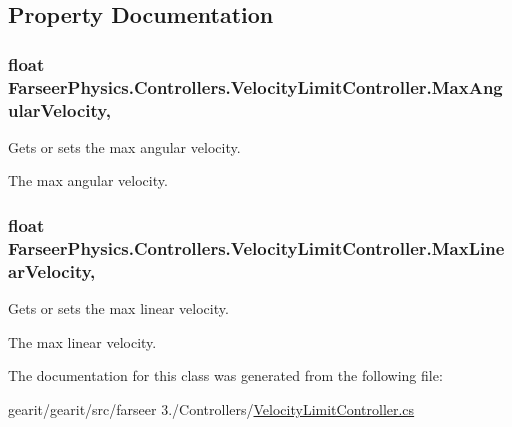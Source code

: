 \subsection{Property Documentation}
\hypertarget{class_farseer_physics_1_1_controllers_1_1_velocity_limit_controller_acb4b2be9435eca10f3505474351095fe}{
\subsubsection[{Max\+Angular\+Velocity}]{\setlength{\rightskip}{0pt plus 5cm}float Farseer\+Physics.\+Controllers.\+Velocity\+Limit\+Controller.\+Max\+Angular\+Velocity\hspace{0.3cm}{\ttfamily [get]}, {\ttfamily [set]}}}\label{class_farseer_physics_1_1_controllers_1_1_velocity_limit_controller_acb4b2be9435eca10f3505474351095fe}


Gets or sets the max angular velocity. 

The max angular velocity.\hypertarget{class_farseer_physics_1_1_controllers_1_1_velocity_limit_controller_a6d71700cce3bda3d5dc594d335be2d9f}{
\subsubsection[{Max\+Linear\+Velocity}]{\setlength{\rightskip}{0pt plus 5cm}float Farseer\+Physics.\+Controllers.\+Velocity\+Limit\+Controller.\+Max\+Linear\+Velocity\hspace{0.3cm}{\ttfamily [get]}, {\ttfamily [set]}}}\label{class_farseer_physics_1_1_controllers_1_1_velocity_limit_controller_a6d71700cce3bda3d5dc594d335be2d9f}


Gets or sets the max linear velocity. 

The max linear velocity.

The documentation for this class was generated from the following file\+:\begin{DoxyCompactItemize}
\item 
gearit/gearit/src/farseer 3./\+Controllers/\hyperlink{_velocity_limit_controller_8cs}{Velocity\+Limit\+Controller.\+cs}\end{DoxyCompactItemize}
